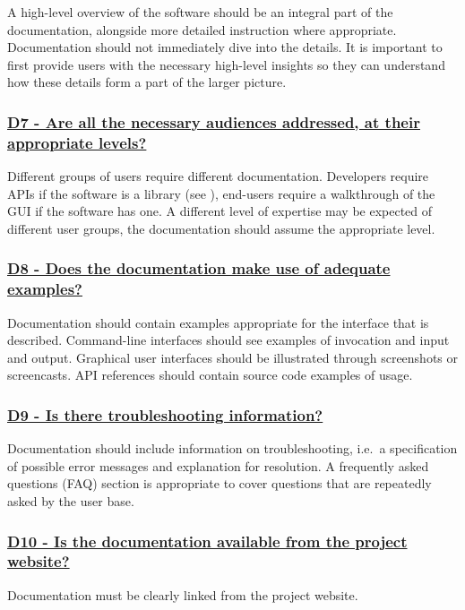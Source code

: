 \documentclass[a4paper,11pt]{article}
\newcommand{\criterion}[2]{\subsubsection*{\underline{#1 - #2}}\label{id:#1}}
\newcommand\CheckTable{%
  \begin{tabular}{ccccc}
    No & Minimal & Adequate & Good & Perfect \\
    0 & 1 & 2 & 3 & 4 \\
    \hline
    $\square$ & $\square$ & $\square$ & $\square$ & $\square$ \\
  \end{tabular}%
}
\newcommand{\refcrit}[1]{%
 \framebox[1.1\width]{\hyperref[id:#1]{#1}}
}
\begin{document}
A high-level overview of the software should be an integral part of the
documentation, alongside more detailed instruction where appropriate.
Documentation should not immediately dive into the details. It is important to
first provide users with the necessary high-level insights so they can understand how
these details form a part of the larger picture.



\newcommand{\dSevenID}{D7}
\newcommand{\dSevenText}{Are all the necessary audiences addressed, at their appropriate levels?}
\criterion{\dSevenID}{\dSevenText}

Different groups of users require different documentation. Developers require
APIs if the software is a library (see \refcrit{L4}), end-users require a walkthrough of the GUI
if the software has one. A different level of expertise may be expected of
different user groups, the documentation should assume the appropriate level.


\newcommand{\dEightID}{D8}
\newcommand{\dEightText}{Does the documentation make use of adequate examples?}
\criterion{\dEightID}{\dEightText}

Documentation should contain examples appropriate for the interface that is
described. Command-line interfaces should see examples of invocation and input
and output. Graphical user interfaces should be illustrated through screenshots or
screencasts. API references should contain source code examples of usage.


\newcommand{\dNineID}{D9}
\newcommand{\dNineText}{Is there troubleshooting information?}
\criterion{\dNineID}{\dNineText}

Documentation should include information on troubleshooting, i.e.\ a
specification of possible error messages and explanation for resolution. A
frequently asked questions (FAQ) section is appropriate to cover questions
that are repeatedly asked by the user base.


\newcommand{\dTenID}{D10}
\newcommand{\dTenText}{Is the documentation available from the project website?}
\criterion{\dTenID}{\dTenText}

Documentation must be clearly linked from the project website.

\end{document}
